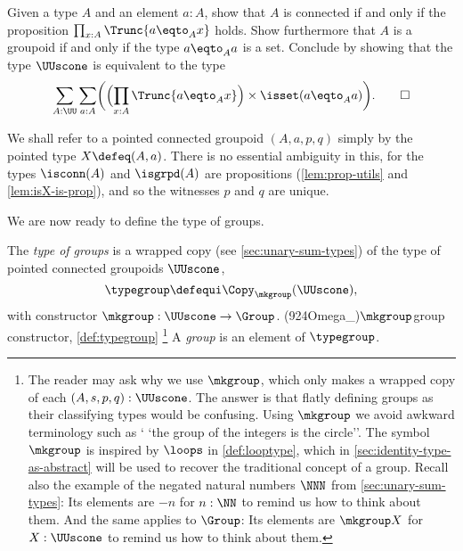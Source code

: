 \begin{xca}\label{xca:defgroup}
  Given a type $A$ and an element $a:A$, 
  show that $A$ is connected if and only if the proposition 
  $\prod_{x:A}\Trunc{a \eqto_A x}$ holds.
  Show furthermore that $A$ is a groupoid if and only if the 
  type $a\eqto_A a$ is a set.
  Conclude by showing that the type $\UUscone$ is equivalent to the type
  \[
    \sum_{A:\UU} \sum_{a:A} \biggl( \Bigl( \prod_{x:A}\Trunc{a \eqto_A x} \Bigr)
      \times \isset( a\eqto_A a ) \biggr).\qedhere
  \]
\end{xca}

\begin{remark}
  We shall refer to a pointed connected groupoid $(A,a,p,q)$ simply
  by the pointed type $X \defeq (A,a)$.
  There is no essential ambiguity in this, for
  the types $\isconn(A)$ and $\isgrpd(A)$ are propositions 
  (\cref{lem:prop-utils} and \cref{lem:isX-is-prop}),
  and so the witnesses $p$ and $q$ are unique.
\end{remark}

We are now ready to define the type of groups.

\begin{definition}\label{def:typegroup}
  The \emph{type of groups} is a wrapped copy (see \cref{sec:unary-sum-types})
  of the type of pointed connected groupoids $\UUscone$,
  \[
    \typegroup \defequi \Copy_{\mkgroup}(\UUscone),
  \]
  with constructor $\mkgroup : \UUscone \to \Group$.%
  \glossary(924Omega_){$\protect\mkgroup$}{group constructor,
  \cref{def:typegroup}}%
  \footnote{%
  The reader may ask why we use $\mkgroup$, which only makes a wrapped
  copy of each $(A,s,p,q): \UUscone$. The answer is that flatly defining
  groups as their classifying types would be confusing.
  Using $\mkgroup$ we avoid awkward terminology such as `
  `the group of the integers is the circle''. 
  The symbol $\mkgroup$ is inspired by $\loops$
  in \cref{def:looptype}, which in \cref{sec:identity-type-as-abstract}
  will be used to recover the traditional concept of a group.
  Recall also the example of the negated natural numbers $\NNN$
  from \cref{sec:unary-sum-types}:
  Its elements are $-n$ for $n:\NN$ to remind us how to think about them.
  And the same applies to $\Group$:
  Its elements are $\mkgroup X$ for $X : \UUscone$
  to remind us how to think about them.
  }
  A \emph{group} is an element of $\typegroup$.
\end{definition}

